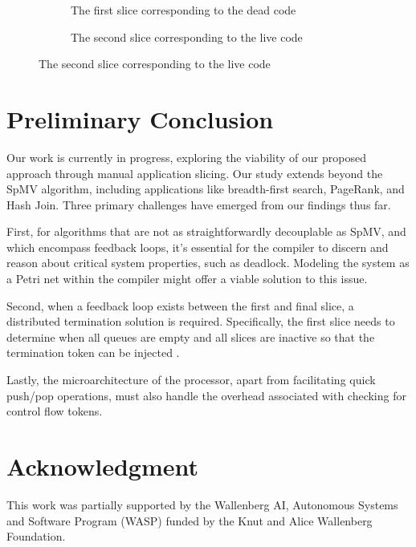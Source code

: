 \documentclass{acaces}
\begin{document}
\begin{figure}[ht]
  \centering

  \begin{subfigure}{1.0\textwidth}
    \centering
    
    \caption{The first slice corresponding to the dead code}
    \label{fig:firstSlice}
  \end{subfigure}

  \begin{subfigure}{1.0\textwidth}
    \centering
    
    \caption{The second slice corresponding to the live code}
    \label{fig:secondSlice}
  \end{subfigure}

\end{figure}

\section{Preliminary Conclusion}

Our work is currently in progress, exploring the viability of our proposed approach through manual application slicing.
Our study extends beyond the SpMV algorithm, including applications like breadth-first search, PageRank, and Hash Join.
Three primary challenges have emerged from our findings thus far.

First, for algorithms that are not as straightforwardly decouplable as SpMV,
and which encompass feedback loops,
it's essential for the compiler to discern and reason about critical system properties, such as deadlock.
Modeling the system as a Petri net within the compiler might offer a viable solution to this issue.

Second, when a feedback loop exists between the first and final slice, a distributed termination solution is required.
Specifically, the first slice needs to determine when all queues are empty and all slices are inactive so that the termination token can be injected \cite{Dijkstra1983}.

Lastly, the microarchitecture of the processor, apart from facilitating quick push/pop operations, must also handle the overhead associated with checking for control flow tokens.

\section{Acknowledgment}

This work was partially supported by the Wallenberg AI, Autonomous Systems and Software Program (WASP)
funded by the Knut and Alice Wallenberg Foundation.


\end{document}
